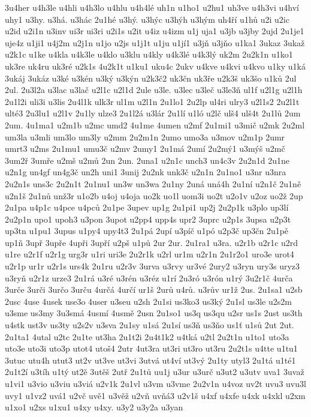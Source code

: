 {3u4her
u4h3le
u4hli
u4h3lo
u4hlu
u4h4lé
uh1n
u1ho1
u2hu1
uh3ve
u4h3vi
u4hví
uhy1
u3hy.
u3há.
u3hác
2u1hé
u3hý.
u3hýc
u3hýh
u3hým
uh4ří
u1hů
u2i
u2ic
u2id
u2i1n
u3inv
ui3r
ui3ri
u2i1s
u2it
u4iz
u4izm
u1j
uja1
u3jb
u3jby
2ujd
2u1je1
uje4z
u1ji1
u4j2m
u2j1n
u1jo
u2js
u1j1t
u1ju
u1jí1
u3jň
u3jňo
u1ka1
3ukaz
3ukaž
u2k1c
u1ke
u4kla
u4k3le
u4klo
u3klu
u4kly
u4k3lé
u4k3lý
uk2m
2u2k1n
u1ko1
uk3re
uk4ru
uk3ré
u2k1s
4u2k1t
u1ku1
uku4c
2ukv
u4kve
u4kvi
u4kvo
u1ky
u1ká
3ukáj
3ukáz
u3ké
u3kén
u3ký
u3kýn
u2k3č2
uk3čn
uk3ře
u2k3š
uk3šo
u1ků
2ul
2ul.
2u3l2a
u3lac
u3lač
u2l1c
u2l1d
2ule
u3le.
u3lec
u3leč
u3le3ň
ul1f
u2l1g
u2l1h
2u1l2i
uli3i
u3lis
2u4l1k
ulk3r
ul1m
u2l1n
2u1lo1
2u2lp
ul4ri
ulry3
u2l1s2
2u2l1t
ulté3
2u3lu1
u2l1v
2u1ly
ulze3
2u1l2á
u3lár
2u1lí
u1ló
u2lč
ulš4
ulš4t
2u1lů
2um
2um.
4u1ma1
u2m1b
u2mc
umd2
4u1me
4umen
u2mf
2u1mi1
u3mič
u2mk
2u2ml
um3la
u3mli
um3lo
um3ly
u2mm
2u2m1n
2umo
umo3a
u3mov
u2m1p
2umr
umrt3
u2ms
2u1mu1
umu3č
u2mv
2umy1
2u1má
2umí
2u2mý1
u3mýš
u2mč
3um2ř
3umře
u2mš
u2mů
2un
2un.
2una1
u2n1c
unch3
un4c3v
2u2n1d
2u1ne
u2n1g
un4gf
un4g3č
un2h
uni1
3unij
2u2nk
unk3č
u2n1n
2u1no1
u3nr
u3nra
2u2n1s
uns3c
2u2n1t
2u1nu1
un3w
un3wa
2u1ny
2uná
uná4h
2u1ní
u2n1č
2u1ně
u2n1š
2u1nů
unž3r
u1o2b
u4oj
u4oja
uo2k
uo1l
uom3i
uo2t
u2o1v
u2oz
uo2ž
2up
2u1pa
u4p1c
u4pce
u4pců
2u1pe
3upev
up1g
2u1pi1
up2j
2u2p1k
u3plo
up3lí
2u2p1n
upo1
upoh3
u3pon
3upot
u2pp4
upp4s
upr2
3uprc
u2p1s
3upsa
u2p3t
up3tn
u1pu1
3upus
u1py4
upy4t3
2u1pá
2upí
u3píč
u1pó
u2p3č
up3čn
2u1pě
up1ň
3upř
3upře
4upři
3upří
u2pš
u1pů
2ur
2ur.
2u1ra1
u3ra.
u2r1b
u2r1c
u2rd
u1re
u2r1f
u2r1g
urg3r
u1ri
uri3e
2u2r1k
u2rl
ur1m
u2r1n
2u1r2o1
uro3e
urot4
u2r1p
ur1r
u2r1s
urs4k
2u1ru
u2r3v
3urva
u3rvy
ur3vé
2ury2
u3ryn
ury3s
uryz3
u3ryň
u2r1z
urze3
2u1rá
u3ré
u3rén
u3réz
u1rí
2u3ró
u3rón
u1rý
3u2r1č
4urča
3urče
3urči
3určo
3urču
4určá
4určí
ur1š
2urů
u4rů.
u3rův
ur1ž
2us.
2u1sa1
u2sb
2usc
4use
4usek
use3o
4user
u3seu
u2sh
2u1si
us3ko3
us3ký
2u1sl
us3le
u2s2m
u3sme
us3my
3u3smá
4usmí
4usmě
2usn
2u1so1
us3q
us3qu
u2sr
us1s
2ust
us3th
u4stk
ust3v
us3ty
u2s2v
u3sva
2u1sy
u1sá
2u1sí
us3ň
us3ňo
us1ť
u1sů
2ut
2ut.
2u1ta1
4utal
u2tc
2u1te
ut3ha
2u1t2i
2u4t1k2
u4tká
u2tl
2u2t1n
u1to1
uto3a
uto3e
uto3i
uto3p
utot4
utoš4
2utr
4ut3ra
ut3ri
ut3ro
ut3ru
2u2t1s
u4tte
u1tu1
3utuc
utu4h
utut3
ut2v
ut3ve
ut3vi
3utvá
ut4ví
ut3vý
2u1ty
utyl3
2u1tá
u1té1
2u1t2í
u3tíh
u1tý
ut2ě
3utěš
2utř
2u1tů
uu1j
u3ur
u3urč
u3ut2
u3utv
uva1
3uvaž
u1vi1
u3vio
u3viu
u3viá
u2v1k
2u1vl
u3vm
u3vme
2u2v1n
u4voz
uv2t
uvu3
uvu3l
uvy1
u1vz2
uvá1
u2vč
uvě1
u3věž
u2vň
uvňá3
u2v1š
u4xf
u4xfe
u4xk
u4xkl
u2xm
u1xo1
u2xs
u1xu1
u4xy
u4xy.
u3y2
u3y2a
u3yan
}
